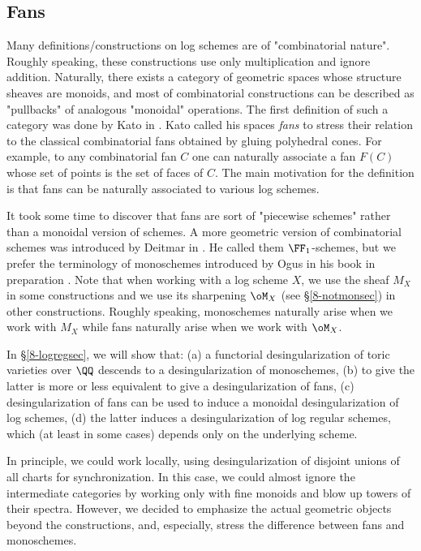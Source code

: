 \documentclass[10pt]{../fichiers-configuration-latex/smfart}
\begin{document}
\subsection{Fans}\label{8-fansec} Many definitions/constructions on
log schemes are of "combinatorial nature". Roughly speaking, these
constructions use only multiplication and ignore addition. Naturally,
there exists a category of geometric spaces whose structure
sheaves are monoids, and most of combinatorial constructions
can be described as "pullbacks" of analogous "monoidal"
operations. The first definition of such a category was done by
Kato in \cite{Toric@Kato}. Kato called his spaces {\em fans} to
stress their relation to the classical combinatorial fans obtained
by gluing polyhedral cones. For example, to any combinatorial fan
$C$ one can naturally associate a fan $F(C)$ whose set of points
is the set of faces of $C$. The main motivation for the definition
is that fans can be naturally associated to various log schemes.

It took some time to discover that fans are sort of "piecewise
schemes" rather than a monoidal version of schemes. A more geometric
version of combinatorial schemes was introduced by Deitmar in
\cite{Deitmar@F1}. He called them $\FF_1$-schemes, but we prefer
the terminology of monoschemes introduced by Ogus in his book
in preparation \cite{Ogus@book}. Note that when working with a
log scheme $X$, we use the sheaf $M_X$ in some constructions and
we use its sharpening $\oM_X$ (see \S\ref{8-notmonsec}) in other
constructions. Roughly speaking, monoschemes naturally arise when we
work with $M_X$ while fans naturally arise when we work with $\oM_X$.

In \S\ref{8-logregsec}, we will show that: (a) a functorial
desingularization of toric varieties over $\QQ$ descends to
a desingularization of monoschemes, (b) to give the latter is
more or less equivalent to give a desingularization of fans,
(c) desingularization of fans can be used to induce a monoidal
desingularization of log schemes, (d) the latter induces a
desingularization of log regular schemes, which (at least in some
cases) depends only on the underlying scheme.

In principle, we could work locally, using desingularization of
disjoint unions of all charts for synchronization. In this case, we
could almost ignore the intermediate categories by working only with
fine monoids and blow up towers of their spectra. However, we decided
to emphasize the actual geometric objects beyond the constructions,
and, especially, stress the difference between fans and monoschemes.
\end{document}
